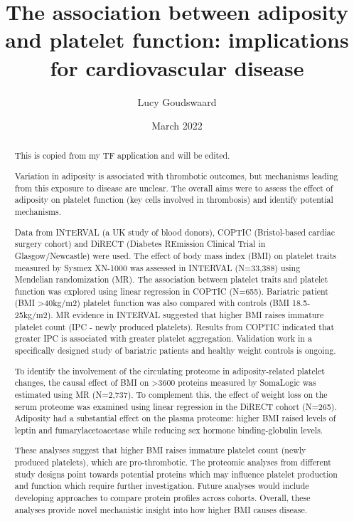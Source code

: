 \documentclass[11pt,twoside]{bristolthesis}
\title{The association between adiposity and platelet function: implications for cardiovascular disease}
\author{Lucy Goudswaard}
\date{March 2022}
\begin{document}
  \maketitle



\frontmatter %
\pagestyle{empty} %
  \begin{abstract}
    This is copied from my TF application and will be edited.

    Variation in adiposity is associated with thrombotic outcomes, but mechanisms leading from this exposure to disease are unclear. The overall aims were to assess the effect of adiposity on platelet function (key cells involved in thrombosis) and identify potential mechanisms.

    Data from INTERVAL (a UK study of blood donors), COPTIC (Bristol-based cardiac surgery cohort) and DiRECT (Diabetes REmission Clinical Trial in Glasgow/Newcastle) were used. The effect of body mass index (BMI) on platelet traits measured by Sysmex XN-1000 was assessed in INTERVAL (N=33,388) using Mendelian randomization (MR). The association between platelet traits and platelet function was explored using linear regression in COPTIC (N=655). Bariatric patient (BMI \textgreater40kg/m2) platelet function was also compared with controls (BMI 18.5-25kg/m2). MR evidence in INTERVAL suggested that higher BMI raises immature platelet count (IPC - newly produced platelets). Results from COPTIC indicated that greater IPC is associated with greater platelet aggregation. Validation work in a specifically designed study of bariatric patients and healthy weight controls is ongoing.

    To identify the involvement of the circulating proteome in adiposity-related platelet changes, the causal effect of BMI on \textgreater3600 proteins measured by SomaLogic was estimated using MR (N=2,737). To complement this, the effect of weight loss on the serum proteome was examined using linear regression in the DiRECT cohort (N=265). Adiposity had a substantial effect on the plasma proteome: higher BMI raised levels of leptin and fumarylacetoacetase while reducing sex hormone binding-globulin levels.

    These analyses suggest that higher BMI raises immature platelet count (newly produced platelets), which are pro-thrombotic. The proteomic analyses from different study designs point towards potential proteins which may influence platelet production and function which require further investigation. Future analyses would include developing approaches to compare protein profiles across cohorts. Overall, these analyses provide novel mechanistic insight into how higher BMI causes disease.
  \end{abstract}
\end{document}
